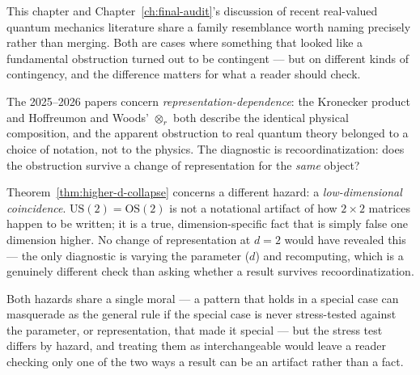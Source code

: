 \begin{remark}
This chapter and Chapter~\ref{ch:final-audit}'s discussion of recent
real-valued quantum mechanics literature share a family resemblance worth
naming precisely rather than merging. Both are cases where something that
looked like a fundamental obstruction turned out to be contingent — but on
different kinds of contingency, and the difference matters for what a
reader should check.

The 2025--2026 papers concern \emph{representation-dependence}: the
Kronecker product and Hoffreumon and Woods' $\otimes_r$ both describe the
identical physical composition, and the apparent obstruction to real
quantum theory belonged to a choice of notation, not to the physics. The
diagnostic is recoordinatization: does the obstruction survive a change of
representation for the \emph{same} object?

Theorem~\ref{thm:higher-d-collapse} concerns a different hazard: a
\emph{low-dimensional coincidence}. $\mathrm{US}(2)=\mathrm{OS}(2)$ is not
a notational artifact of how $2\times2$ matrices happen to be written; it
is a true, dimension-specific fact that is simply false one dimension
higher. No change of representation at $d=2$ would have revealed this —
the only diagnostic is varying the parameter ($d$) and recomputing, which
is a genuinely different check than asking whether a result survives
recoordinatization.

Both hazards share a single moral — a pattern that holds in a special case
can masquerade as the general rule if the special case is never
stress-tested against the parameter, or representation, that made it
special — but the stress test differs by hazard, and treating them as
interchangeable would leave a reader checking only one of the two ways a
result can be an artifact rather than a fact.
\end{remark}
